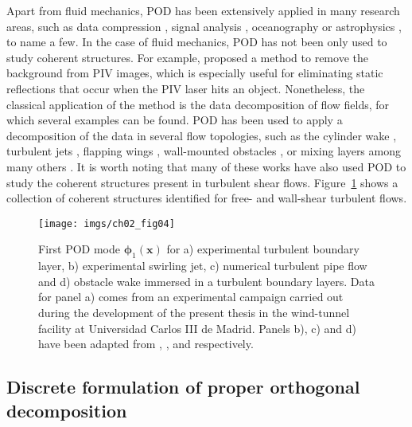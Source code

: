 Apart from fluid mechanics, POD has been extensively applied in many research areas, such as data compression \citep{andrews1967adaptive}, signal analysis \citep{algazi1969optimality}, oceanography \citep{preisendorfer1988principal} or astrophysics \citep{soummer2012detection}, to name a few.
In the case of fluid mechanics, POD has not been only used to study coherent structures.
For example, \citet{mendez2017pod} proposed a method to remove the background from PIV images, which is especially useful for eliminating static reflections that occur when the PIV laser hits an object.
Nonetheless, the classical application of the method is the data decomposition of flow fields, for which several examples can be found.
POD has been used to apply a decomposition of the data in several flow topologies, such as the cylinder wake \citep{deane1991low,feng2011proper,raiola2016wake}, turbulent jets \citep{glauser1991dynamics,berry2017application,mendez2019multi}, flapping wings \citep{liang2015symmetry,troshin2018modeling,raiola2021data}, wall-mounted obstacles \citep{mallor2018wall,mallor2019modal,guemes2019flow}, or mixing layers \citep{delville1999examination,citriniti2000reconstruction,kaiser2014cluster} among many others \citep{rowley2017model}.
It is worth noting that many of these works have also used POD to study the coherent structures present in turbulent shear flows.
Figure~\ref{ch02:fig04} shows a collection of coherent structures identified for free- and wall-shear turbulent flows.
\begin{figure}
  \centering
  \texttt{[image: imgs/ch02\_fig04]}
  \caption{\label{ch02:fig04} First POD mode $\boldsymbol{\phi}_1(\boldsymbol{x})$ for a) experimental turbulent boundary layer, b) experimental swirling jet, c) numerical turbulent pipe flow and d) obstacle wake immersed in a turbulent boundary layers. Data for panel a) comes from an experimental campaign carried out during the development of the present thesis in the wind-tunnel facility at Universidad Carlos III de Madrid. Panels b), c) and d) have been adapted from \citet{ceglia2014three},  \citet{hellstrom2014energetic}, and \citet{guemes2019flow} respectively.}
\end{figure}

\subsection{Discrete formulation of proper orthogonal decomposition}\label{ch02:s31}


